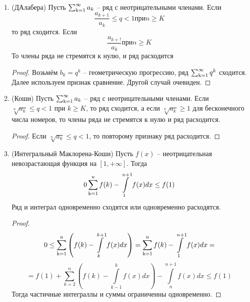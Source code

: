 \begin{enumerate}
\begin{proof}
\end{proof}
TODO: Вставить замечание
\item
(ДАлабера) Пусть $\operatorname{\sum_{k=1}^{\infty}} a_k$ -- ряд с неотрицательными членами. Если
$$\frac{a_{k+1}}{a_k} \le q < 1 \text{при} n\ge K$$
то ряд сходится. Если
$$ \frac{a_{k+!}}{a_k} \text{при} n\ge K$$
То члены ряда не стремятся к нулю, и ряд расходится
\begin{proof}
Возьмём $b_k = q^k$ -- геометрическую прогрессию, ряд $\operatorname{\sum_{k=1}^{\infty}} q^k$ сходится.
Далее используем признак сравнение. Другой случай очевиден.
\end{proof}
\item
(Коши) Пусть $\operatorname{\sum_{k=1}^{\infty}} a_k$ -- ряд с неотрицательными членами. Если $ \sqrt[n]{a_k}\le q < 1$ при $k \ge K $,
то ряд сходится, а если $ \sqrt[k]{a_k}\ge 1$ для бесконечного числа номеров, то члены ряда не стремятся к нулю и ряд расходится.
\begin{proof}
Если  $\sqrt[n]{a_k}\le q < 1$, то повторому признаку ряд расходится. 
\end{proof}
\item
(Интегральный Маклорена-Коши) Пусть $f(x)$ -- неотрицательная невозрастающая функция на $ [1,+\infty] $. Тогда
$$ 0 \operatorname{\sum_{k=1}^{n}} f(k) - \int\limits_1^{n+1}f(x)dx\le f(1)$$
Ряд и интеграл одновременно сходятся или одновременно расходятся.
\begin{proof}
$$ 0\le \operatorname{\sum_{k=1}^{n}} \left( f(k) - \int\limits_k^{k+1}f(x)dx \right) = \operatorname{\sum_{k=1}^{n}} f(k) - \int\limits_1^{n+1}f(x)dx = $$
$$ = f(1)+\sum_{k=2}^n \left( f(k) - \int\limits_{k-1}^k f(x)dx \right) - \int\limits_n^{n+1} f(x)dx \le f(1)$$
Тогда частичные интеграллы и суммы ограниченны одновременно.
\end{proof}
\end{enumerate}